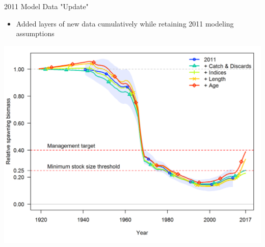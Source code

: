 \documentclass[pdf]{beamer}\usepackage[]{graphicx}\usepackage[]{color}
\begin{document}
\begin{frame}{2011 Model Data "Update"}
  \begin{itemize}
    \item Added layers of new data cumulatively while retaining 2011 modeling assumptions
  \end{itemize}
  \begin{center}
    \includegraphics[scale = 0.42]{figures/Data_Bratio_uncertainty.png}
  \end{center}
\end{frame}
\end{document}
